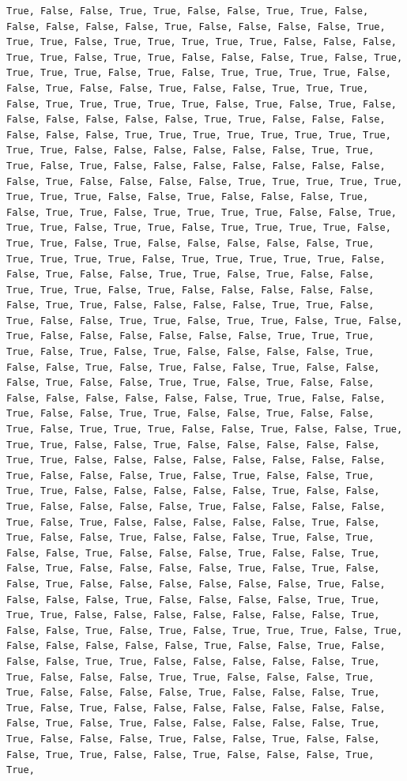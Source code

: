 \documentclass[
  letterpaper,
  DIV=11,
  numbers=noendperiod]{scrartcl}
\begin{document}
\begin{verbatim}
True, False, False, True, True, False, False, True, True, False, False, False, False, False, True, False, False, False, False, True, True, True, False, True, True, True, True, True, False, False, False, True, True, False, True, True, False, False, False, True, False, True, True, True, True, False, True, False, True, True, True, True, False, False, True, False, False, True, False, False, True, True, True, False, True, True, True, True, True, False, True, False, True, False, False, False, False, False, False, True, True, False, False, False, False, False, False, True, True, True, True, True, True, True, True, True, True, False, False, False, False, False, False, True, True, True, False, True, False, False, False, False, False, False, False, False, True, False, False, False, False, True, True, True, True, True, True, True, True, False, False, True, False, False, False, True, False, True, True, False, True, True, True, True, False, False, True, True, True, False, True, True, False, True, True, True, True, False, True, True, False, True, False, False, False, False, False, True, True, True, True, True, False, True, True, True, True, True, False, False, True, False, False, True, True, False, True, False, False, True, True, True, False, True, False, False, False, False, False, False, True, True, False, False, False, False, True, True, False, True, False, False, True, True, False, True, True, False, True, False, True, False, False, False, False, False, False, True, True, True, True, False, True, False, True, False, False, False, False, True, False, False, True, False, True, False, False, True, False, False, False, True, False, False, True, True, False, True, False, False, False, False, False, False, False, False, True, True, False, False, True, False, False, True, True, False, False, True, False, False, True, False, True, True, True, False, False, True, False, False, True, True, True, False, False, True, False, False, False, False, False, True, True, False, False, False, False, False, False, False, False, True, False, False, False, True, False, True, False, False, True, True, True, False, False, False, False, False, True, False, False, True, False, False, False, False, True, False, False, False, False, True, False, True, False, False, False, False, False, True, False, True, False, False, True, False, False, False, True, False, True, False, False, True, False, False, False, True, False, False, True, False, True, False, False, False, False, True, False, True, False, False, True, False, False, False, False, False, False, True, False, False, False, False, True, False, False, False, False, True, True, True, True, False, False, False, False, False, False, False, True, False, False, True, False, True, False, True, True, True, False, True, False, False, False, False, False, True, False, False, True, False, False, False, True, True, False, False, False, False, False, True, True, False, False, False, True, True, False, False, False, True, True, False, False, False, False, True, False, False, False, True, True, False, True, False, False, False, False, False, False, False, False, True, False, True, False, False, False, False, False, True, True, False, False, False, True, False, False, True, False, False, False, True, True, False, False, True, False, False, False, True, True, 
\end{verbatim}
\end{document}
